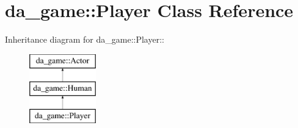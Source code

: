 \hypertarget{classda__game_1_1Player}{
\section{da\_\-game::Player Class Reference}
\label{classda__game_1_1Player}
}
Inheritance diagram for da\_\-game::Player::\begin{figure}[H]
\begin{center}
\leavevmode
\includegraphics[height=3cm]{classda__game_1_1Player}
\end{center}
\end{figure}
